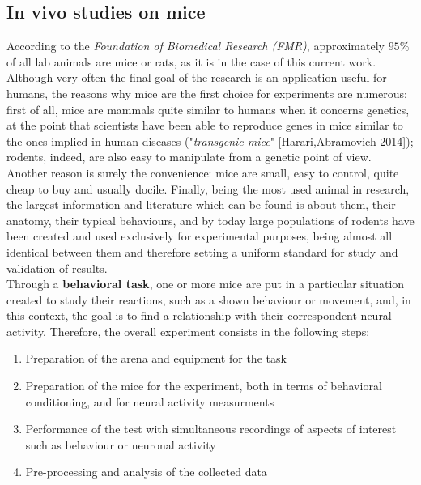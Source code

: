 \documentclass[a4paper]{article}
\begin{document}
\newpage

\subsection{In vivo studies on mice}

According to the \textit{Foundation of Biomedical Research (FMR)}, approximately $95\% $ of all lab animals are mice or rats, as it is in the case of this current work. Although very often the final goal of the research is an application useful for humans, the reasons why mice are the first choice for experiments are numerous: first of all, mice are mammals quite similar to humans when it concerns genetics, at the point that scientists have been able to reproduce genes in mice similar to the ones implied in human diseases ("\textit{transgenic mice}" [Harari,Abramovich 2014]); rodents, indeed, are also easy to manipulate from a genetic point of view. Another reason is surely the convenience: mice are small, easy to control, quite cheap to buy and usually docile. Finally, being the most used animal in research, the largest information and literature which can be found is about them, their anatomy, their typical behaviours, and by today large populations of rodents have been created and used exclusively for experimental purposes, being almost all identical between them and therefore setting a uniform standard for study and validation of results. \\
Through a  \textbf{behavioral task}, one or more mice are put in a particular situation created to study their reactions, such as a shown behaviour or movement, and, in this context, the goal is to find a relationship with their correspondent neural activity. Therefore, the overall experiment consists in the following steps:
\begin{enumerate}
	\item Preparation of the arena and equipment for the task 
	\item Preparation of the mice for the experiment, both in terms of behavioral conditioning, and for neural activity measurments
	\item Performance of the test with simultaneous recordings of  aspects of interest such as behaviour or neuronal activity
	\item Pre-processing and analysis of the collected data
\end{enumerate}
\end{document}
